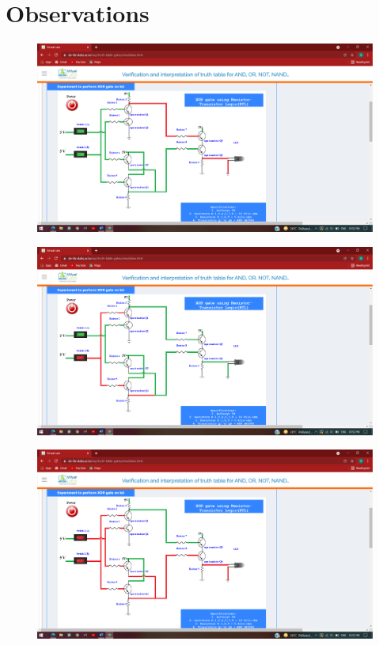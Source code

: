 \section{Observations}
	\begin{figure}[h]
		\centering
		\includegraphics[width=0.9\linewidth]{img/exp6/4}
		\caption{}
		\label{fig:6:4}
	\end{figure}
		\begin{figure}[h]
		\centering
		\includegraphics[width=0.9\linewidth]{img/exp6/5}
		\caption{}
		\label{fig:6:5}
	\end{figure}
		\begin{figure}[h]
		\centering
		\includegraphics[width=0.9\linewidth]{img/exp6/6}
		\caption{}
		\label{fig:6:6}
	\end{figure}
